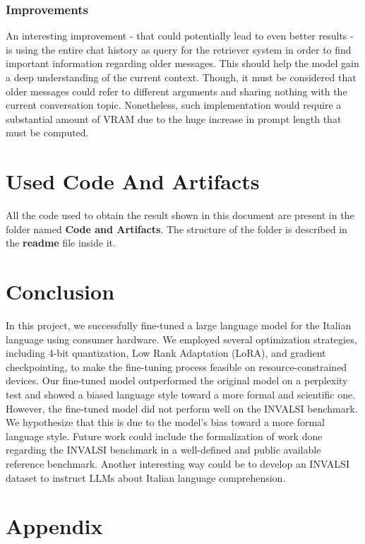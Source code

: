 \documentclass{article}
\begin{document}
	\subsubsection{Improvements}
	An interesting improvement - that could potentially lead to even better results - is using the entire chat history as query for the retriever system in order to find important information regarding older messages. 
	This should help the model gain a deep understanding of the current context. 
	Though, it must be considered that older messages could refer to different arguments and sharing nothing with the current conversation topic.  
	Nonetheless, such implementation would require a substantial amount of VRAM due to the huge increase in prompt length that must be computed.
	
	\section{Used Code And Artifacts}
	All the code used to obtain the result shown in this document are present in the folder named \textbf{Code and Artifacts}. The structure of the folder is described in the \textbf{readme} file inside it.
	 
	\section{Conclusion}
	In this project, we successfully fine-tuned a large language model for the Italian language using consumer hardware. We employed several optimization strategies, including 4-bit quantization, Low Rank Adaptation (LoRA), and gradient checkpointing, to make the fine-tuning process feasible on resource-constrained devices. Our fine-tuned model outperformed the original model on a perplexity test and showed a biased language style toward a more formal and scientific one. 
	However, the fine-tuned model did not perform well on the INVALSI benchmark. We hypothesize that this is due to the model's bias toward a more formal language style.
	Future work could include the formalization of work done regarding the INVALSI benchmark in a well-defined and public available reference benchmark.
	Another interesting way could be to develop an INVALSI dataset to instruct LLMs about Italian language comprehension. 
	
	\section*{Appendix}
	
\end{document}
